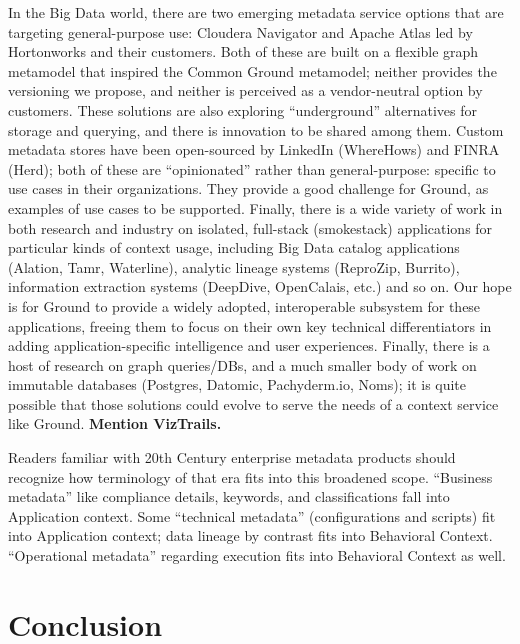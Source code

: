 \documentclass{sig-alternate}
\begin{document}
In the Big Data world, there are two emerging metadata service options that are targeting general-purpose use: Cloudera Navigator and Apache Atlas led by Hortonworks and their customers. Both of these are built on a flexible graph metamodel that inspired the Common Ground \mantle metamodel; neither provides the \core versioning we propose, and neither is perceived as a vendor-neutral option by customers.  These solutions are also exploring ``underground'' alternatives for storage and querying, and there is innovation to be shared among them. Custom metadata stores have been open-sourced by LinkedIn (WhereHows) and FINRA (Herd); both of these are ``opinionated'' rather than general-purpose: specific to use cases in their organizations. They provide a good challenge for Ground, as examples of use cases to be supported. Finally, there is a wide variety of work in both research and industry on isolated, full-stack (smokestack) applications for particular kinds of context usage, including Big Data catalog applications (Alation, Tamr, Waterline), analytic lineage systems (ReproZip, Burrito), information extraction systems (DeepDive, OpenCalais, etc.) and so on. Our hope is for Ground to provide a widely adopted, interoperable subsystem for these applications, freeing them to focus on their own key technical differentiators in adding application-specific intelligence and user experiences.  Finally, there is a host of research on graph queries/DBs, and a much smaller body of work on immutable databases (Postgres, Datomic, Pachyderm.io, Noms); it is quite possible that those solutions could evolve to serve the needs of a context service like Ground.  \textbf{Mention VizTrails.}

Readers familiar with 20th Century enterprise metadata products should recognize how terminology of that era fits into this broadened scope. ``Business metadata'' like compliance details, keywords, and classifications fall into Application context. Some ``technical metadata''  (configurations and scripts) fit into Application context; data lineage by contrast fits into Behavioral Context. ``Operational metadata'' regarding execution fits into Behavioral Context as well.

\section{Conclusion}
\label{sec:conclusion}
\end{document}

